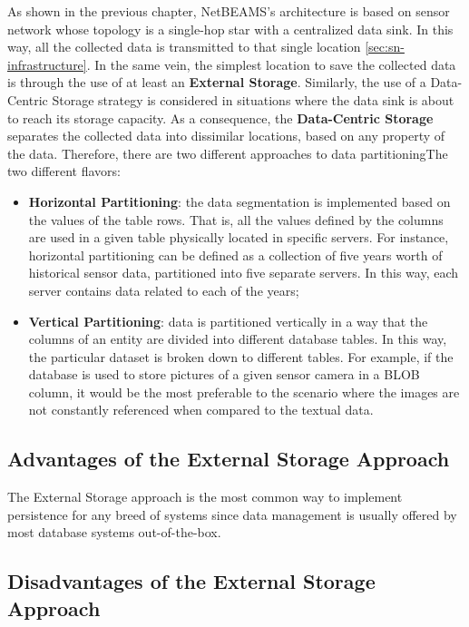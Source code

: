 As shown in the previous chapter, NetBEAMS's architecture is based on sensor
network whose topology is a single-hop star with a centralized data sink. In
this way, all the collected data is transmitted to that single location
\ref{sec:sn-infrastructure}. In the same vein, the simplest location to save
the collected data is through the use of at least an \textbf{External Storage}.
Similarly, the use of a Data-Centric Storage strategy is considered in
situations where the data sink is about to reach its storage capacity. As a
consequence, the \textbf{Data-Centric Storage} separates the collected data
into dissimilar locations, based on any property of the data. Therefore,
there are two different approaches to data partitioningThe two different
flavors: 

\begin{itemize}
  \item \textbf{Horizontal Partitioning}: the data segmentation is implemented
  based on the values of the table rows. That is, all the values defined by the
  columns are used in a given table physically located in specific servers.
  For instance, horizontal partitioning can be defined as a collection of five
  years worth of historical sensor data, partitioned into five separate
  servers. In this way, each server contains data related to each of the years;
  \item \textbf{Vertical Partitioning}: data is partitioned vertically in a way
  that the columns of an entity are divided into different database tables. In
  this way, the particular dataset is broken down to different tables. For
  example, if the database is used to store pictures of a given sensor camera
  in a BLOB column, it would be the most preferable to the scenario where the
  images are not constantly referenced when compared to the textual data.
\end{itemize} 

\subsection{Advantages of the External Storage Approach}

The External Storage approach is the most common way to implement persistence
for any breed of systems since data management is usually offered by most
database systems out-of-the-box. 

\subsection{Disadvantages of the External Storage Approach}

